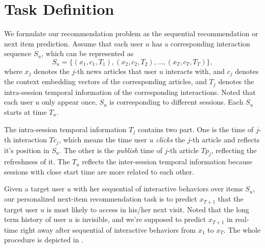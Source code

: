 \section{Task Definition}
We formulate our recommendation problem as the sequential recommendation or next item prediction. Assume that each user $u$ has a corresponding interaction sequence $S_u$, which can be represented as \[S_u=\{(x_1,c_1,T_1),(x_2,c_2,T_2),...,(x_T,c_T,T_T)\},\] where $x_j$ denotes the $j$-th news articles that user $u$ interacts with, and $c_j$ denotes the context embedding vectors of the corresponding articles, and $T_j$ denotes the intra-session temporal information of the corresponding interactions. Noted that each user $u$ only appear once, $S_u$ is corresponding to different sessions. Each $S_u$ starts at time $T_u$.

The intra-session temporal information $T_j$ contains two part. One is the time of $j$-th interaction $Tc_j$, which means the time user $u$ \textit{clicks} the $j$-th article and reflects it's position in $S_u$. The other is the \textit{publish} time of $j$-th article $Tp_j$, reflecting the refreshness of it. The $T_u$ reflects the inter-session temporal information because sessions with close start time are more related to each other.

Given a target user $u$ with her sequential of interactive behaviors over items $S_u$, our personalized next-item recommendation task is to predict $x_{T+1}$ that the target user $u$ is most likely to access in his/her next visit. Noted that the long term history of user $u$ is invisible, and we're supposed to predict $x_{T+1}$ in real-time right away after sequential of interactive behaviors from $x_1$ to $x_T$. The whole procedure is depicted in .